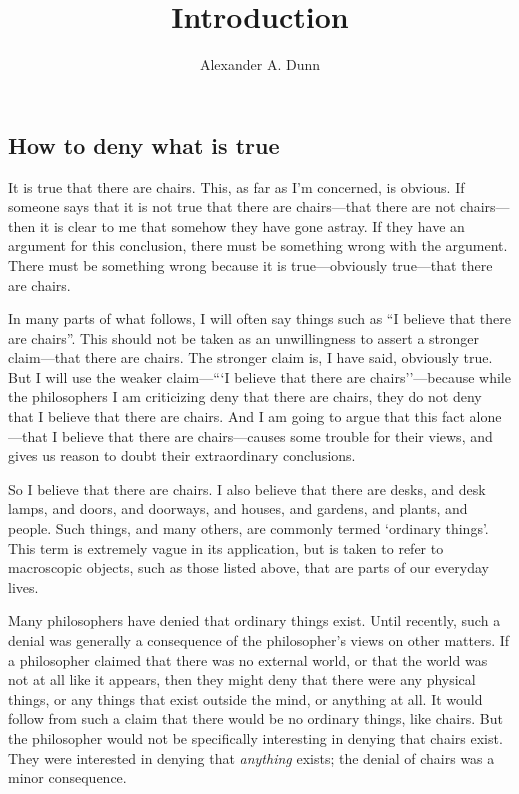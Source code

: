 \documentclass[11pt]{article}
\title{Introduction}
\author{Alexander A. Dunn}
\begin{document}
\ifstandalone
\maketitle
\begin{spacing}{1.5}
\fi

\section{How to deny what is true}
It is true that there are chairs.  This, as far as I'm concerned, is
obvious.  If someone says that it is not true that there are
chairs---that there are not chairs---then it is clear to me that
somehow they have gone astray.  If they have an argument for this
conclusion, there must be something wrong with the argument.  There
must be something wrong because it is true---obviously true---that
there are chairs.

In many parts of what follows, I will often say things such as ``I
believe that there are chairs''.  This should not be taken as an
unwillingness to assert a stronger claim---that there are chairs.  The
stronger claim is, I have said, obviously true.  But I will use the
weaker claim---```I believe that there are chairs''---because while
the philosophers I am criticizing deny that there are chairs, they do
not deny that I believe that there are chairs.  And I am going to
argue that this fact alone---that I believe that there are
chairs---causes some trouble for their views, and gives us reason to
doubt their extraordinary conclusions.

So I believe that there are chairs.  I also believe that there are
desks, and desk lamps, and doors, and doorways, and houses, and
gardens, and plants, and people.  Such things, and many others, are
commonly termed `ordinary things'.  This term is extremely vague in
its application, but is taken to refer to macroscopic objects, such as
those listed above, that are parts of our everyday lives.

Many philosophers have denied that ordinary things exist.  Until
recently, such a denial was generally a consequence of the
philosopher's views on other matters.  If a philosopher claimed that
there was no external world, or that the world was not at all like it
appears, then they might deny that there were any physical things, or
any things that exist outside the mind, or anything at all.  It would
follow from such a claim that there would be no ordinary things, like
chairs.  But the philosopher would not be specifically interesting in
denying that chairs exist.  They were interested in denying that {\em
  anything} exists; the denial of chairs was a minor consequence.


\end{spacing}
\end{document}
